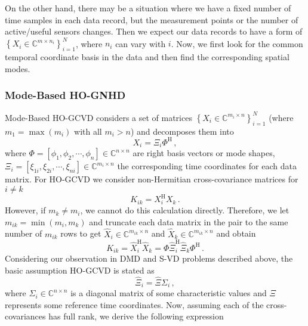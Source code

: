\documentclass[10pt]{article}
\begin{document}
On the other hand, there may be a situation where we have a fixed number of time samples in each data record, but the measurement points or the number of active/useful sensors changes.
Then we expect our data records to have a form of  $\left\{X_i\in\mathbb{C}^{m\times n_i}\right\}_{i=1}^N$, where $n_i$ can vary with $i$.
Now, we first look for the common temporal coordinate basis in the data and then find the corresponding spatial modes.
\subsubsection{Mode-Based HO-GNHD}

Mode-Based HO-GCVD considers a set of matrices $\left\{X_i\in\mathbb{C}^{m_i\times n}\right\}_{i=1}^N$ (where $m_1 = \max(m_i)$ with all $m_i > n$) and decomposes them into
\begin{equation}\label{HONHD1}
    X_i = \Xi_i \Phi^\mathrm{H}\,,
\end{equation}
where $\Phi=[\phi_1,\phi_2,\cdots,\phi_n]\in\mathbb{C}^{n\times n}$ are right basis vectors or mode shapes, $\Xi_i=[\xi_{1i},\xi_{2i},\cdots,\xi_{ni}]\in\mathbb{C}^{m_i \times n}$ the corresponding time coordinates for each data matrix.
For HO-GCVD we consider non-Hermitian cross-covariance matrices for $i\ne k$ 
\begin{equation}
    K_{ik} = X_i^\mathrm{H} X_k\,.
\end{equation}
However, if $m_k \ne m_i$, we cannot do this calculation directly.
Therefore, we let $m_{ik} = \min\left(m_i,m_k\right)$ and truncate each data matrix in the pair to the same number of $m_{ik}$ rows to get $\hat X_i \in \mathbb{C}^{m_{ik}\times n}$ and $\hat X_k \in \mathbb{C}^{m_{ik}\times n}$ and obtain
\begin{equation}
    K_{ik} = \hat X_i^\mathrm{H} \hat X_k = \Phi \hat \Xi_i^\mathrm{H}  \hat \Xi_k \Phi^\mathrm{H}\,.
\end{equation}
Considering our observation in DMD and S-VD problems described above,  the basic assumption HO-GCVD is stated as
\begin{equation}
    \hat \Xi_i = \hat \Xi \Sigma_i\,,
\end{equation}
where $\Sigma_i\in \mathbb{C}^{n\times n}$ is a diagonal matrix of some characteristic values and $\Xi$ represents some reference time coordinates.
Now, assuming each of the cross-covariances has full rank, we derive the following expression
\end{document}
